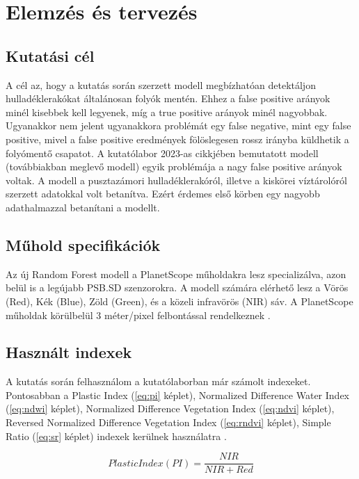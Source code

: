 \chapter{Elemzés és tervezés}
\label{ch:spec}

\section{Kutatási cél}
\label{ch:goals}

A cél az, hogy a kutatás során szerzett modell megbízhatóan detektáljon hulladéklerakókat általánosan folyók mentén. Ehhez a false positive arányok minél kisebbek kell legyenek, míg a true positive arányok minél nagyobbak. Ugyanakkor nem jelent ugyanakkora problémát egy false negative, mint egy false positive, mivel a false positive eredmények fölöslegesen rossz irányba küldhetik a folyómentő csapatot. 
A kutatólabor 2023-as cikkjében bemutatott modell (továbbiakban meglevő modell) egyik problémája a nagy false positive arányok voltak. A modell a pusztazámori hulladéklerakóról, illetve a kiskörei víztárolóról szerzett adatokkal volt betanítva. Ezért érdemes első körben egy nagyobb adathalmazzal betanítani a modellt.

\section{Műhold specifikációk}

Az új Random Forest modell a PlanetScope műholdakra lesz specializálva, azon belül is a legújabb PSB.SD szenzorokra\cite{planetsensors2024}. A modell számára elérhető lesz a Vörös (Red), Kék (Blue), Zöld (Green), és a közeli infravörös (NIR) sáv. A PlanetScope műholdak körülbelül 3 méter/pixel felbontással rendelkeznek \cite{planetresolution2024}.

\section{Használt indexek}

A kutatás során felhasználom a kutatólaborban már számolt indexeket. Pontosabban a Plastic Index (\ref{eq:pi} képlet), Normalized Difference Water Index (\ref{eq:ndwi} képlet), Normalized Difference Vegetation Index (\ref{eq:ndvi} képlet), Reversed Normalized Difference Vegetation Index (\ref{eq:rndvi} képlet), Simple Ratio (\ref{eq:sr} képlet) indexek kerülnek használatra \cite{Themistocleous2020, magyar2023}.

\begin{equation}\label{eq:pi}
    Plastic Index (PI) = \frac{NIR}{NIR + Red}
\end{equation}

